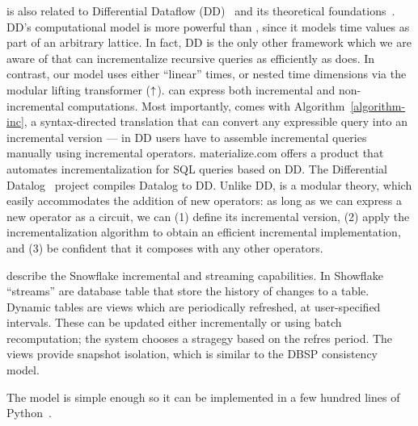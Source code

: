 \dbsp is also related to Differential Dataflow
(DD)~\cite{mcsherry-cidr13,murray-sosp13,chothia-vldb16} and its
theoretical foundations~\cite{abadi-fossacs15}.  DD's computational
model is more powerful than \dbsp, since it models time values as part
of an arbitrary lattice.  In fact, DD is the only other framework
which we are aware of that can incrementalize recursive queries as
efficiently as \dbsp does.  In contrast, our model uses either
``linear'' times, or nested time dimensions via the modular lifting
transformer (${\uparrow}$).  \dbsp can express both incremental and
non-incremental computations.  Most importantly, \dbsp comes with
Algorithm~\ref{algorithm-inc}, a syntax-directed translation that can
convert any expressible query into an incremental version --- in DD
users have to assemble incremental queries manually using incremental
operators.  materialize.com offers a product that automates
incrementalization for SQL queries based on DD.  The Differential
Datalog~\cite{ryzhyk-datalog19} project compiles Datalog to DD.
Unlike DD, \dbsp is a modular theory, which easily accommodates the
addition of new operators: as long as we can express a new operator as
a \dbsp circuit, we can (1) define its incremental version, (2) apply
the incrementalization algorithm to obtain an efficient incremental
implementation, and (3) be confident that it composes with any other
operators.

\cite{akidau-amd23,akidau-debs24} describe the Snowflake incremental
and streaming capabilities.  In Showflake ``streams'' are database
table that store the history of changes to a table.  Dynamic tables
are views which are periodically refreshed, at user-specified
intervals.  These can be updated either incrementally or using batch
recomputation; the system chooses a stragegy based on the refres
period.  The views provide snapshot isolation, which is similar to the
DBSP consistency model.

The \dbsp model is simple enough so it can be implemented in a few
hundred lines of Python~\cite{dbsp-python}.
